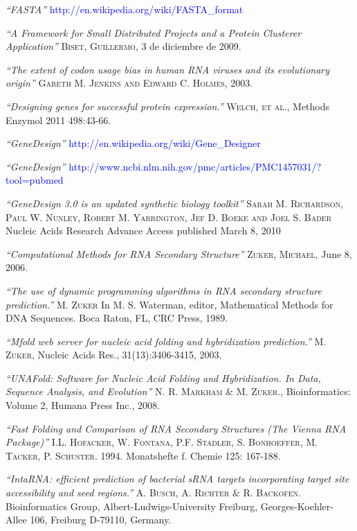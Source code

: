 \documentclass[12pt,a4paper,spanish]{article}
\begin{document}
\begin{thebibliography}{99}
\small	{} {\em{“FASTA”}} \textcolor{blue}{http://en.wikipedia.org/wiki/FASTA\_format}

\small	{} {\em{“A Framework for Small Distributed Projects and a Protein Clusterer Application”}}
			\textsc{Biset, Guillermo}, 3 de diciembre de 2009.

\small {} {\em{“The extent of codon usage bias in human RNA viruses and its evolutionary origin”}}
			\textsc{Gareth M. Jenkins and Edward C. Holmes}, 2003.
 
\small {} {\em{“Designing genes for successful protein expression.”}}
			\textsc{Welch, et al.}, Methods Enzymol 2011 498:43-66. 

\small {} {\em{“GeneDesign”}} \textcolor{blue}{http://en.wikipedia.org/wiki/Gene\_Designer}

\small {} {\em{“GeneDesign”}} \textcolor{blue}{http://www.ncbi.nlm.nih.gov/pmc/articles/PMC1457031/?tool=pubmed}

\small {} {\em{“GeneDesign 3.0 is an updated synthetic biology toolkit”}} 
			\textsc{Sarah M. Richardson, Paul W. Nunley, Robert M. Yarrington, Jef D. Boeke and Joel S. Bader} Nucleic 				Acids Research Advance Access published March 8, 2010

\small {} {\em{“Computational Methods for RNA Secondary Structure”}} 
			\textsc{Zuker, Michael}, June 8, 2006.

\small {} {\em{“The use of dynamic programming algorithms in RNA secondary structure prediction.”}}
		\textsc{M. Zuker} In M. S. Waterman, editor, Mathematical Methods for DNA Sequences. Boca Raton, FL,
         CRC Press, 1989.

\small {} {\em{“Mfold web server for nucleic acid folding and hybridization prediction.”}}
		\textsc{M. Zuker}, Nucleic Acids Res., 31(13):3406-3415, 2003.

\small {} {\em{“UNAFold: Software for Nucleic Acid Folding and Hybridization. In Data, Sequence Analysis, and Evolution”}}
		\textsc{N. R. Markham \& M. Zuker.}, Bioinformatics: Volume 2, Humana Press Inc., 2008.

\small {} {\em{“Fast Folding and Comparison of RNA Secondary Structures (The Vienna RNA Package)”}}
		\textsc{I.L. Hofacker, W. Fontana, P.F. Stadler, S. Bonhoeffer, M. Tacker, P. Schuster}. 
        1994. Monatshefte f. Chemie 125: 167-188.

\small {} {\em{“IntaRNA: efficient prediction of bacterial sRNA targets incorporating target site accessibility and seed regions.”}}
		\textsc{A. Busch, A. Richter \& R. Backofen}. Bioinformatics Group, Albert-Ludwigs-University Freiburg, Georges-Koehler-Allee 106, Freiburg D-79110, Germany.
 

\end{thebibliography}
\end{document}
